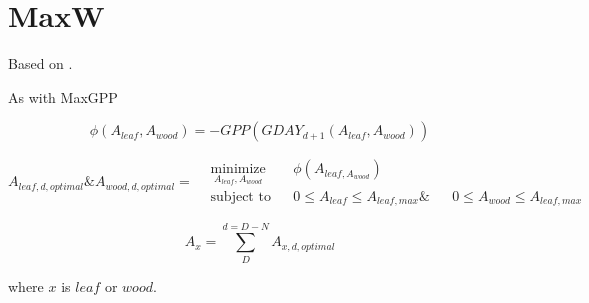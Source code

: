 \chapter{MaxW}

Based on \citep{McMurtrie2013}.

As with MaxGPP 


\begin{equation}
	\phi(A_{leaf},A_{wood}) = - GPP (GDAY_{d+1}(A_{leaf},A_{wood}))
\end{equation}


\begin{equation*}
A_{leaf,d,optimal} \text{\&} A_{wood,d,optimal}=
\begin{aligned}
& \underset{A_{leaf}, A_{wood}}{\text{minimize}}
& & \phi(A_{leaf,A_{wood}}) \\
& \text{subject to}
& & 0 \leq A_{leaf} \leq A_{leaf,max} \&
& & 0 \leq A_{wood} \leq A_{leaf,max}
\end{aligned}
\end{equation*}

\begin{equation}
	A_{x}= \sum_{D}^{d=D-N} A_{x,d,optimal}
\end{equation}

where $x$ is $leaf$ or $wood$.
